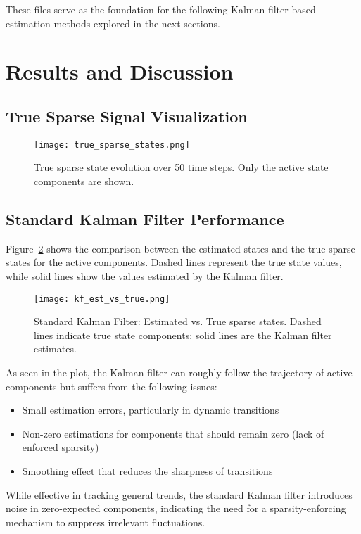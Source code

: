 \documentclass[12pt]{article}
\begin{document}
These files serve as the foundation for the following Kalman filter-based estimation methods explored in the next sections.

\section{Results and Discussion}

\subsection{True Sparse Signal Visualization}

\begin{figure}[h!]
  \centering
  \texttt{[image: true\_sparse\_states.png]}
  \caption{True sparse state evolution over 50 time steps. Only the active state components are shown.}
  \label{fig:sparse-true}
\end{figure}

\subsection{Standard Kalman Filter Performance}
Figure~\ref{fig:kf-standard} shows the comparison between the estimated states and the true sparse states for the active components. Dashed lines represent the true state values, while solid lines show the values estimated by the Kalman filter.

\begin{figure}[h!]
  \centering
  \texttt{[image: kf\_est\_vs\_true.png]}
  \caption{Standard Kalman Filter: Estimated vs. True sparse states. Dashed lines indicate true state components; solid lines are the Kalman filter estimates.}
  \label{fig:kf-standard}
\end{figure}

As seen in the plot, the Kalman filter can roughly follow the trajectory of active components but suffers from the following issues:

\begin{itemize}
  \item Small estimation errors, particularly in dynamic transitions
  \item Non-zero estimations for components that should remain zero (lack of enforced sparsity)
  \item Smoothing effect that reduces the sharpness of transitions
\end{itemize}

While effective in tracking general trends, the standard Kalman filter introduces noise in zero-expected components, indicating the need for a sparsity-enforcing mechanism to suppress irrelevant fluctuations.
\end{document}
